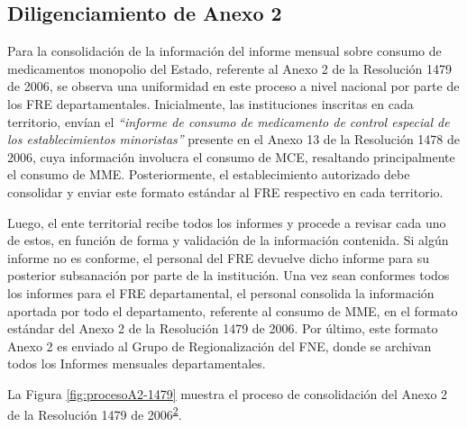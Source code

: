 \documentclass[
  oneside]{book}
\begin{document}
\hypertarget{diligenciamiento-de-anexo-2}{%
\subsection{Diligenciamiento de Anexo 2}\label{diligenciamiento-de-anexo-2}}

Para la consolidación de la información del informe mensual sobre consumo de medicamentos monopolio del Estado, referente al Anexo 2 de la Resolución 1479 de 2006, se observa una uniformidad en este proceso a nivel nacional por parte de los FRE departamentales. Inicialmente, las instituciones inscritas en cada territorio, envían el \emph{``informe de consumo de medicamento de control especial de los establecimientos minoristas''} presente en el Anexo 13 de la Resolución 1478 de 2006, cuya información involucra el consumo de MCE, resaltando principalmente el consumo de MME. Posteriormente, el establecimiento autorizado debe consolidar y enviar este formato estándar al FRE respectivo en cada territorio.

Luego, el ente territorial recibe todos los informes y procede a revisar cada uno de estos, en función de forma y validación de la información contenida. Si algún informe no es conforme, el personal del FRE devuelve dicho informe para su posterior subsanación por parte de la institución. Una vez sean conformes todos los informes para el FRE departamental, el personal consolida la información aportada por todo el departamento, referente al consumo de MME, en el formato estándar del Anexo 2 de la Resolución 1479 de 2006. Por último, este formato Anexo 2 es enviado al Grupo de Regionalización del FNE, donde se archivan todos los Informes mensuales departamentales.

La Figura \ref{fig:procesoA2-1479} muestra el proceso de consolidación del Anexo 2 de la Resolución 1479 de 2006\textsuperscript{\protect\hyperlink{ref-MSPS1479-2006}{2}}.
\end{document}

